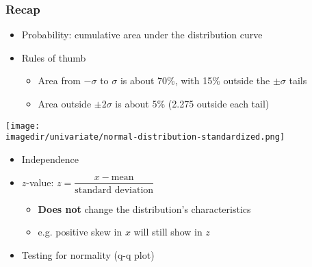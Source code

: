 
\begin{frame}\frametitle{Recap}
	\begin{itemize}
		\item	Probability: cumulative area under the distribution curve
		\item	Rules of thumb
		\begin{itemize}
			\item	Area from $-\sigma$ to $\sigma$ is about 70\%, with 15\% outside the $\pm \sigma$ tails
			\item	Area outside $\pm 2\sigma$ is about 5\% (2.275 outside each tail)
		\end{itemize}
	\end{itemize}
	\begin{center}
		\texttt{[image: \\imagedir/univariate/normal-distribution-standardized.png]}
	\end{center}
	\vspace{-12pt}
	\begin{itemize}
		\item	Independence
		\item	$z$-value: $z = \dfrac{x - \text{mean}}{\text{standard deviation}}$
		\begin{itemize}
			\item	\textbf{Does not} change the distribution's characteristics
			\item	e.g. positive skew in $x$ will still show in $z$
		\end{itemize}
		\item	Testing for normality (q-q plot)
	\end{itemize}
\end{frame}

